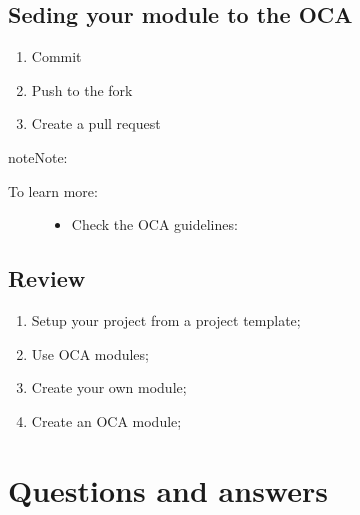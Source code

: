 \documentclass[letterpaper,10pt,english]{sphinxmanual}
\begin{document}
\section{Seding your module to the OCA}
\label{\detokenize{technical:seding-your-module-to-the-oca}}\begin{enumerate}
%
\item {} 
Commit

\item {} 
Push to the fork

\item {} 
Create a pull request

\end{enumerate}

\begin{sphinxadmonition}{note}{Note:}\begin{description}
\item[{To learn more:}] \leavevmode\begin{itemize}
\item {} 
Check the OCA guidelines: 

\end{itemize}

\end{description}
\end{sphinxadmonition}


\section{Review}
\label{\detokenize{technical:review}}\begin{enumerate}
%
\item {} 
Setup your project from a project template;

\item {} 
Use OCA modules;

\item {} 
Create your own module;

\item {} 
Create an OCA module;

\end{enumerate}


\chapter{Questions and answers}
\label{\detokenize{technical:questions-and-answers}}
\end{document}
